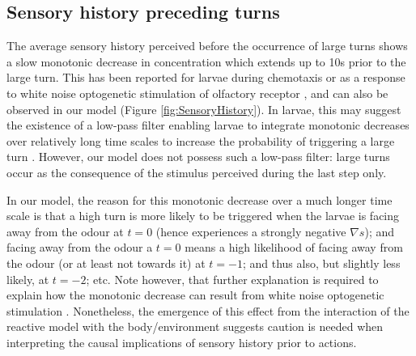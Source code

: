\documentclass[11pt,a4paper]{article}
\begin{document}
\subsection{Sensory history preceding turns}
The average sensory history perceived before the occurrence of large turns shows a slow monotonic decrease in concentration which extends up to 10s prior to the large turn. This has been reported for larvae during chemotaxis \citep{gomez2011active} or as a response to white noise optogenetic stimulation of olfactory receptor \citep{gepner2015computations},
 and can also be observed in our model (Figure \ref{fig:SensoryHistory}). In larvae, this may suggest the existence of a low-pass filter enabling larvae to integrate monotonic decreases over relatively long time scales to increase the probability of triggering a large turn \citep{gomez2011active,davies2015model,gepner2015computations}. However, our model does not possess such a low-pass filter: large turns occur as the consequence of the stimulus perceived during the last step only.

 In our model, the reason for this monotonic decrease over a much longer time scale is that a high turn is more likely to be triggered when the larvae is facing away from the odour at $t=0$ (hence experiences a strongly negative $\nabla s$); and facing away from the odour a $t=0$ means a high likelihood of facing away from the odour (or at least not towards it) at $t=-1$; and thus also, but slightly less likely, at $t=-2$; etc.  Note however, that further explanation is required to explain how the monotonic decrease can result from white noise optogenetic stimulation \cite{gepner2015computations}. Nonetheless, the emergence of this effect from the interaction of the reactive model with the body/environment suggests caution is needed when interpreting the causal implications of sensory history prior to actions.
\end{document}
